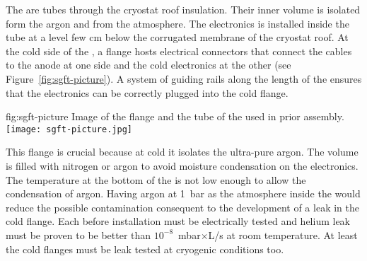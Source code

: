 The  are tubes through the cryostat roof insulation.
Their inner volume is isolated form the argon and from the atmosphere.
The electronics is installed inside the tube at a level few cm below the corrugated membrane of the cryostat roof.
At the cold side of the , a flange hosts electrical connectors that connect the cables to the anode at one side and the cold electronics at the other (see Figure~\ref{fig:sgft-picture}).
A system of guiding rails along the length of the  ensures that the electronics can be correctly plugged into the cold flange.
\begin{dunefigure}{fig:sgft-picture}
{Image of the flange and the tube of the  used in  prior assembly.}
\texttt{[image: sgft-picture.jpg]}
\end{dunefigure}
This flange is crucial because at cold it isolates the ultra-pure argon.
The  volume is filled with nitrogen or argon to avoid moisture condensation on the electronics.
The temperature at the bottom of the  is not low enough to allow the condensation of argon.
Having argon at 1~bar as the atmosphere inside the  would reduce the possible  contamination consequent to the development of a leak in the cold flange.
Each  before installation must be electrically tested and helium leak must be proven to be better than $10^{-8}$~mbar$\times$L/s at room temperature.
At least the cold flanges must be leak tested at cryogenic conditions too.




